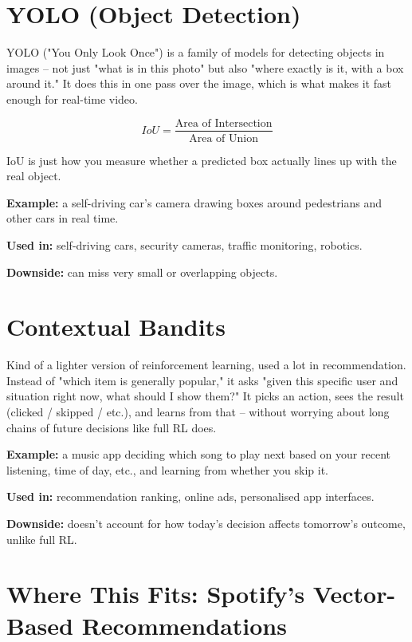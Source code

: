 \documentclass[11pt]{article}
\begin{document}
\section{YOLO (Object Detection)}

YOLO ("You Only Look Once") is a family of models for detecting objects in images -- not just "what is in this photo" but also "where exactly is it, with a box around it." It does this in one pass over the image, which is what makes it fast enough for real-time video.

\[
IoU = \frac{\text{Area of Intersection}}{\text{Area of Union}}
\]

IoU is just how you measure whether a predicted box actually lines up with the real object.

\textbf{Example:} a self-driving car's camera drawing boxes around pedestrians and other cars in real time.

\textbf{Used in:} self-driving cars, security cameras, traffic monitoring, robotics.

\textbf{Downside:} can miss very small or overlapping objects.

\section{Contextual Bandits}

Kind of a lighter version of reinforcement learning, used a lot in recommendation. Instead of "which item is generally popular," it asks "given this specific user and situation right now, what should I show them?" It picks an action, sees the result (clicked / skipped / etc.), and learns from that -- without worrying about long chains of future decisions like full RL does.

\textbf{Example:} a music app deciding which song to play next based on your recent listening, time of day, etc., and learning from whether you skip it.

\textbf{Used in:} recommendation ranking, online ads, personalised app interfaces.

\textbf{Downside:} doesn't account for how today's decision affects tomorrow's outcome, unlike full RL.


\vspace{15\baselineskip}
\section{Where This Fits: Spotify's Vector-Based Recommendations}
\end{document}
